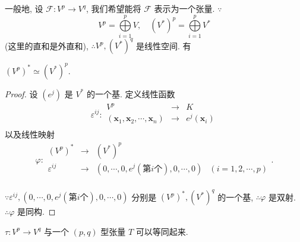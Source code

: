 \documentclass[color=black,device=normal,lang=cn,mode=geye]{elegantnote}
\begin{document}
一般地, 设 $\mathcal{F}:V^p\to V^q$, 我们希望能将 $\mathcal{F}$ 表示为一个张量. $\because$
\[V^p=\bigoplus\limits_{i=1}^pV,\quad (V^*)^p=\bigoplus\limits_{i=1}^pV^*\]
(这里的直和是外直和), $\therefore V^p,(V^*)^q$ 是线性空间. 有
\begin{lemma}\label{l1.1}
    $(V^p)^*\simeq(V^*)^p$.
\end{lemma}
\begin{proof}
    设 $(e^j)$ 是 $V^*$ 的一个基. 定义线性函数
    \[\varepsilon^{ij}:\begin{array}{rcl}
        V^p & \to & K \\
        (\boldsymbol{x}_1,\boldsymbol{x}_2,\cdots,\boldsymbol{x}_n) & \to & e^j(\boldsymbol{x}_i) \\
    \end{array}\]
    以及线性映射
    \[\varphi:\begin{array}{rcll}
        (V^p)^* & \to & (V^*)^p \\
        \varepsilon^{ij} & \to & (0,\cdots,0,e^j(\text{第}i\text{个}),0,\cdots,0) & (i=1,2,\cdots,p) \\
    \end{array}.\]

    $\because\varepsilon^{ij},(0,\cdots,0,e^j(\text{第}i\text{个}),0,\cdots,0)$ 分别是 $(V^p)^*,(V^*)^q$ 的一个基, $\therefore\varphi$ 是双射. $\therefore\varphi$ 是同构.
\end{proof}
\begin{theorem}\label{t1.3}
    $\tau:V^p\to V^q$ 与一个 $(p,q)$ 型张量 $T$ 可以等同起来.
\end{theorem}
\end{document}
